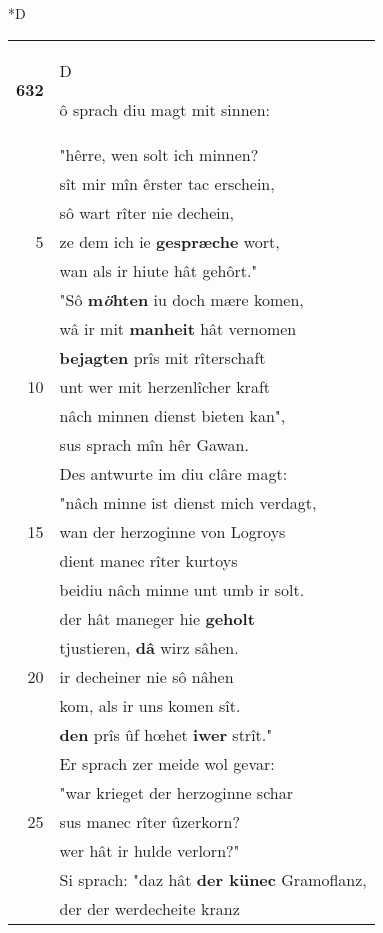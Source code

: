 \documentclass[8pt,a4paper,notitlepage]{article}
\begin{document}
\begin{table}[ht]
\begin{minipage}[t]{0.5\linewidth}
\small
\begin{center}*D
\end{center}
\begin{tabular}{rl}
\textbf{632} & \begin{large}D\end{large}ô sprach diu magt mit sinnen:\\ 
 & "hêrre, wen solt ich minnen?\\ 
 & sît mir mîn êrster tac erschein,\\ 
 & sô wart rîter nie dechein,\\ 
5 & ze dem ich ie \textbf{gespræche} wort,\\ 
 & wan als ir hiute hât gehôrt."\\ 
 & "Sô \textbf{m\textit{ö}hten} iu doch mære komen,\\ 
 & wâ ir mit \textbf{manheit} hât vernomen\\ 
 & \textbf{bejagten} prîs mit rîterschaft\\ 
10 & unt wer mit herzenlîcher kraft\\ 
 & nâch minnen dienst bieten kan",\\ 
 & sus sprach mîn hêr Gawan.\\ 
 & Des antwurte im diu clâre magt:\\ 
 & "nâch minne ist dienst mich verdagt,\\ 
15 & wan der herzoginne von Logroys\\ 
 & dient manec rîter kurtoys\\ 
 & beidiu nâch minne unt umb ir solt.\\ 
 & der hât maneger hie \textbf{geholt}\\ 
 & tjustieren, \textbf{dâ} wirz sâhen.\\ 
20 & ir decheiner nie sô nâhen\\ 
 & kom, als ir uns komen sît.\\ 
 & \textbf{den} prîs ûf hœhet \textbf{iwer} strît."\\ 
 & Er sprach zer meide wol gevar:\\ 
 & "war krieget der herzoginne schar\\ 
25 & sus manec rîter ûzerkorn?\\ 
 & wer hât ir hulde verlorn?"\\ 
 & Si sprach: "daz hât \textbf{der künec} Gramoflanz,\\ 
 & der der werdecheite kranz\\ 

\end{tabular}
\end{minipage}
\end{table}
\end{document}
